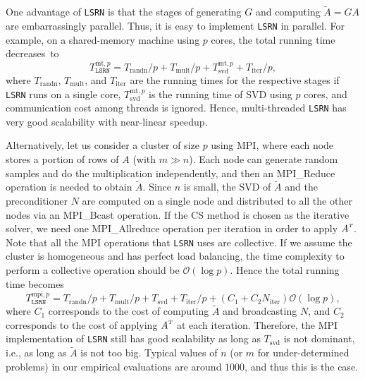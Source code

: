\documentclass{siamltex}
\newcommand{\T}{^{\raisebox{0.09em}{\hbox{\tiny $T$}}\hspace{-0.1em}}}
\begin{document}
One advantage of \texttt{LSRN} is that the stages of generating $G$ and 
computing $\tilde{A} = G A$ are embarrassingly parallel. 
Thus, it is easy to implement \texttt{LSRN} in parallel. 
For example, on a shared-memory machine using $p$ cores, the total running
time decreases~to
\begin{equation}
  \label{eq:mt_time}
  T_{\texttt{LSRN}}^{\text{mt},p} = T_{\text{randn}}/p + T_{\text{mult}}/p + T_{\text{svd}}^{\text{mt},p} + T_{\text{iter}}/p,
\end{equation}
where $T_{\text{randn}}$, $T_{\text{mult}}$, and $T_{\text{iter}}$ are the 
running times for the respective stages if \texttt{LSRN} runs on a single 
core, $T_{\text{svd}}^{\text{mt},p}$ is the running time of SVD using $p$ 
cores, and communication cost among threads is ignored. 
Hence, multi-threaded \texttt{LSRN} has very good scalability with 
near-linear speedup. 

Alternatively, let us consider a cluster of size $p$ using MPI, where each node
stores a portion of rows of $A$ (with $m \gg n$). Each node can generate random
samples and do the multiplication independently, and then an MPI\_Reduce
operation is needed to obtain $\tilde{A}$. Since $n$ is small, the SVD of
$\tilde{A}$ and the preconditioner $N$ are computed on a single node and
distributed to all the other nodes via an MPI\_Bcast operation. If the CS method
is chosen as the iterative solver, we need one MPI\_Allreduce operation per
iteration in order to apply $A\T$. Note that all the MPI operations that
\texttt{LSRN} uses are collective. If we assume the cluster is homogeneous and
has perfect load balancing, the time complexity to perform a collective
operation should be $\mathcal{O}(\log p)$. Hence the total running time becomes
\begin{equation}
  \label{eq:mpi_time}
  T_{\texttt{LSRN}}^{\text{mpi},p} = T_{\text{randn}}/p + T_{\text{mult}}/p + T_{\text{svd}} + T_{\text{iter}}/p + ( C_1 + C_2 N_{\text{iter}} ) \mathcal{O}( \log p ),
\end{equation}
where $C_1$ corresponds to the cost of computing $\tilde{A}$ and broadcasting
$N$, and $C_2$ corresponds to the cost of applying $A\T$ at each
iteration. Therefore, the MPI implementation of \texttt{LSRN} still has good
scalability as long as $T_{\text{svd}}$ is not dominant, i.e., as long as
$\tilde{A}$ is not too big.  Typical values of $n$ (or $m$ for under-determined
problems) in our empirical evaluations are around $1000$, and thus this is the
case.
\end{document}
